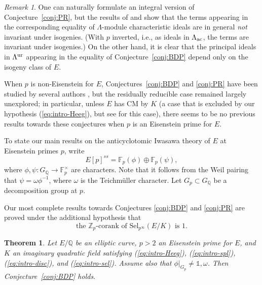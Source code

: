 \documentclass[10pt]{amsart}
\numberwithin{equation}{section}
\newtheorem{theorem}{Theorem}
\theoremstyle{definition}
\theoremstyle{remark}
\newtheorem*{rem}{Remark}
\newcommand{\Z}{\mathbb{Z}}
\newcommand{\Q}{\mathbb{Q}}
\begin{document}
\begin{rem}
One can naturally formulate an integral version of Conjecture~\ref{conj:PR}, but the results of \cite{perrinriou} and \cite{howard-GZ} show that the terms appearing in the corresponding equality of $\Lambda$-module characteristic ideals are in general \emph{not} invariant under isogenies. (With $p$ inverted, i.e., as ideals in $\Lambda_{\rm ac}$, the terms are invariant under isogenies.) On the other hand, it is clear that the principal ideals in $\Lambda^{\rm ur}$ appearing in the equality of Conjecture~\ref{conj:BDP} depend only on the isogeny class of $E$.
\end{rem}

When $p$ is non-Eisenstein for $E$, Conjectures~\ref{conj:BDP} and \ref{conj:PR} have been studied by several authors \cite{bertolini,howard,howard-gl2-type,wan-heegner,castellaheights,BCK}, but the residually reducible case remained largely unexplored; in particular, unless $E$ has CM by $K$ (a case that is excluded by our hypothesis (\ref{eq:intro-Heeg}), but see \cite{CMpconverse} for this case), there seems to be no previous results towards these conjectures when $p$ is an Eisenstein prime for $E$. 

To state our main results on %
the anticyclotomic Iwasawa theory of $E$ at Eisenstein primes $p$, write
\[
E[p]^{ss}=\mathbb{F}_p(\phi)\oplus\mathbb{F}_p(\psi),
\]
where $\phi,\psi:G_\Q\rightarrow\mathbb{F}_p^\times$ are characters. Note that it follows from the Weil pairing that $\psi=\omega\phi^{-1}$, where $\omega$ is the Teichm\"uller character. Let $G_p\subset G_{\mathbb{Q}}$ be a decomposition group at $p$. 

Our most complete results towards Conjectures \ref{conj:BDP} and \ref{conj:PR} are proved under the additional hypothesis
that
\begin{equation}\label{eq:intro-sel}
\text{the $\Z_p$-corank of $\mathrm{Sel}_{p^\infty}(E/K)$ is $1$.}\tag{Sel}
\end{equation}

\begin{theorem}\label{thm:C}
Let $E/\mathbb{Q}$ be an elliptic curve, $p>2$ an Eisenstein prime for $E$, and $K$ an imaginary quadratic field satisfying {\rm (\ref{eq:intro-Heeg})}, {\rm (\ref{eq:intro-spl})}, {\rm (\ref{eq:intro-disc})}, and
{\rm (\ref{eq:intro-sel})}. 
Assume also that
$\phi\vert_{G_p}\neq\mathds{1},\omega$. Then Conjecture~\ref{conj:BDP} holds.
\end{theorem}
\end{document}
